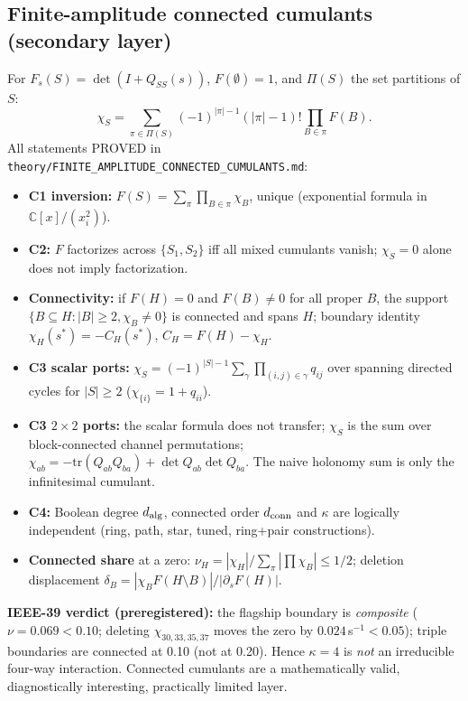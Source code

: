 \documentclass[10pt,a4paper]{article}
\theoremstyle{definition}
\newcommand{\status}[1]{\textsf{\small #1}}
\begin{document}
\subsection{Finite-amplitude connected cumulants (secondary layer)}\label{sec:cc}
For $F_s(S)=\det(I+Q_{SS}(s))$, $F(\emptyset)=1$, and $\Pi(S)$ the set partitions of $S$:
\begin{equation}\chi_S=\sum_{\pi\in\Pi(S)}(-1)^{|\pi|-1}(|\pi|-1)!\prod_{B\in\pi}F(B).\end{equation}
All statements \status{PROVED} in \nolinkurl{theory/FINITE_AMPLITUDE_CONNECTED_CUMULANTS.md}:
\begin{itemize}
\item \textbf{C1 inversion:} $F(S)=\sum_{\pi}\prod_{B\in\pi}\chi_B$, unique (exponential formula in $\mathbb C[x]/(x_i^2)$).
\item \textbf{C2:} $F$ factorizes across $\{S_1,S_2\}$ iff all mixed cumulants vanish; $\chi_S=0$ alone does not imply factorization.
\item \textbf{Connectivity:} if $F(H)=0$ and $F(B)\ne0$ for all proper $B$, the support $\{B\subseteq H:|B|\ge2,\chi_B\ne0\}$ is connected and spans $H$; boundary identity $\chi_H(s^*)=-C_H(s^*)$, $C_H=F(H)-\chi_H$.
\item \textbf{C3 scalar ports:} $\chi_S=(-1)^{|S|-1}\sum_{\gamma}\prod_{(i,j)\in\gamma}q_{ij}$ over spanning directed cycles for $|S|\ge2$ ($\chi_{\{i\}}=1+q_{ii}$).
\item \textbf{C3 $2\times2$ ports:} the scalar formula does not transfer; $\chi_S$ is the sum over block-connected channel permutations; $\chi_{ab}=-\mathrm{tr}(Q_{ab}Q_{ba})+\det Q_{ab}\det Q_{ba}$. The naive holonomy sum is only the infinitesimal cumulant.
\item \textbf{C4:} Boolean degree $d_{\rm alg}$, connected order $d_{\rm conn}$ and $\kappa$ are logically independent (ring, path, star, tuned, ring+pair constructions).
\item \textbf{Connected share} at a zero: $\nu_H=|\chi_H|/\sum_\pi|\prod\chi_B|\le1/2$; deletion displacement $\delta_B=|\chi_BF(H\setminus B)|/|\partial_sF(H)|$.
\end{itemize}
\textbf{IEEE-39 verdict (preregistered):} the flagship boundary is \emph{composite}
($\nu=0.069<0.10$; deleting $\chi_{30,33,35,37}$ moves the zero by $0.024$\,s$^{-1}<0.05$); triple boundaries
are connected at 0.10 (not at 0.20). Hence $\kappa=4$ is \emph{not} an irreducible four-way interaction.
Connected cumulants are a mathematically valid, diagnostically interesting, practically limited layer.
\end{document}
